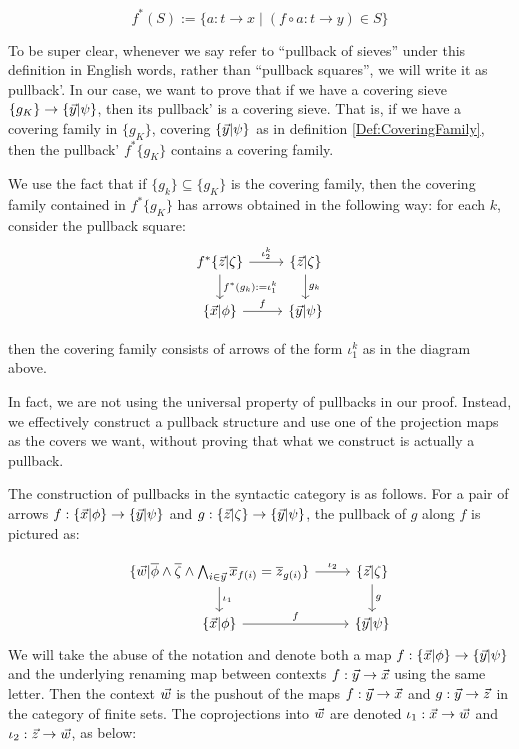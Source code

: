 \begin{equation*}
  f^*(S) := \{a: t \to x \mid (f\circ a: t\to y) \in S\}
\end{equation*}

To be super clear, whenever we say refer to ``pullback of sieves'' under this definition in English words, rather than ``pullback squares'', we will write it
as pullback'. 
In our case, we want to prove that if we have a covering sieve $\{g_K\}\to \{ \vec{y} | \psi \}$, then its pullback' is a covering sieve.
That is, if we have a covering family in $\{g_K\}$, covering $\{ \vec{y} | \psi \}$ as in definition \ref{Def:CoveringFamily}, then the pullback'
$f^*\{g_K\}$ contains a covering family.

We use the fact that if $\{g_k\}\subseteq \{g_K\}$ is the covering family, then the covering family contained in $f^*\{g_K\}$ has arrows obtained in the following 
way: for each $k$, consider the pullback square: 
\[
  \begin{tikzcd}
     f^* \zzeta \ar[r,"\iota_2^k"]\ar[d,"f^*(g_k):= \iota_1^k"]  & \zzeta\ar[d,"g_k"]\\
     \xphi \ar[r,"f"] & \ypsi
  \end{tikzcd}
\]

then the covering family consists of arrows of the form $\iota_1^k$ as in the diagram above.

In fact, we are not using the universal property of pullbacks in our proof. Instead, we effectively construct a pullback structure and use
one of the projection maps as the covers we want, without proving that what we construct is actually a pullback.

The construction of pullbacks in the syntactic category is as follows. For a pair of arrows $f: \{ \vec{x} | \phi \}\to \{ \vec{y} | \psi \}$ and $g:\{ \vec{z} | \zeta \}\to \{ \vec{y} | \psi \}$, 
the pullback of $g$ along $f$ is pictured as:


\[
  \begin{tikzcd}
     \fmlInCtx{\vw}{\ophi\land \ozeta \land\bigwedge_{i\in \vec{y}} \ox_{f(i)} = \oz_{g(i)}} \ar[r,"\iota_2"]\ar[d,"\iota_1"]  & \zzeta\ar[d,"g"]\\
     \xphi \ar[r,"f"] & \ypsi
  \end{tikzcd}
\]
We will take the abuse of the notation and denote both a map $f:\{ \vec{x} | \phi \}\to \{ \vec{y} | \psi \}$ and the underlying renaming map between contexts $f:\vec{y}\to \vec{x}$ 
using the same letter. 
Then the context $\vec{w}$ is the pushout of the maps $f:\vec{y}\to \vec{x}$ and $g:\vec{y}\to \vec{z}$ in the category of finite sets. 
The coprojections into $\vec{w}$ are denoted $\iota_1:\vec{x}\to\vec{w}$ and $\iota_2:\vec{z}\to \vec{w}$, as below:


